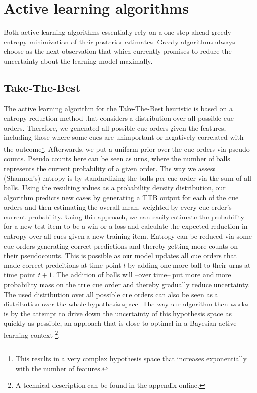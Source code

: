 \documentclass[10pt,letterpaper]{article}
\begin{document}
\section{Active learning algorithms}
Both active learning algorithms essentially rely on a one-step ahead greedy entropy minimization of their posterior estimates. Greedy algorithms always choose as the next observation that which currently promises to reduce the uncertainty about the learning model maximally. 


\subsection{Take-The-Best}
The active learning algorithm for the Take-The-Best heuristic is based on a entropy reduction method that considers a distribution over all possible cue orders. Therefore, we generated all possible cue orders given the features, including those where some cues are unimportant or negatively correlated with the outcome\footnote{This results in a very complex hypothesis space that increases exponentially with the number of features.}. Afterwards, we put a uniform prior over the cue orders via pseudo counts. Pseudo counts here can be seen as urns, where the number of balls represents the current probability of a given order. The way we assess (Shannon's) entropy is by standardizing the balls per cue order via the sum of all balls. Using the resulting values as a probability density distribution, our algorithm predicts new cases by generating a TTB output for each of the cue orders and then estimating the overall mean, weighted by every cue order's current probability. Using this approach, we can easily estimate the probability for a new test item to be a win or a loss and calculate the expected reduction in entropy over all cues given a new training item. Entropy can be reduced via some cue orders generating correct predictions and thereby getting more counts on their pseudocounts. This is possible as our model updates all cue orders that made correct predcitions at time point $t$ by adding one more ball to their urns at time point $t+1$. The addition of balls will --over time-- put more and more probability mass on the true cue order and thereby gradually reduce uncertainty. The used distribution over all possible cue orders can also be seen as a distribution over the whole hypothesis space. The way our algorithm then works is by the attempt to drive down the uncertainty of this hypothesis space as quickly as possible, an approach that is close to optimal in a Bayesian active learning context \citep{golovin2010near}\footnote{A technical description can be found in the appendix online.}. 
\end{document}
